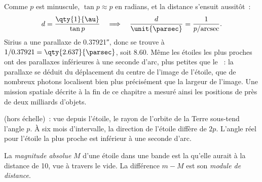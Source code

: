 Comme $p$ est minuscule, $\tan p \approx p$ en radians, et la distance s'ensuit
aussitôt~:
\[
  d = \frac{\qty{1}{\au}}{\tan p} \quad\Longrightarrow\quad
  \frac{d}{\unit{\parsec}} = \frac{1}{p/\text{arcsec}} .
\]
Sirius a une parallaxe de \ang{;;0.37921}, donc se trouve à $1/0.37921 =
\qty{2.637}{\parsec}$, soit \qty{8.60}{\lightyear}. Même les étoiles les plus
proches ont des parallaxes inférieures à une seconde d'arc, plus petites que le
~: la parallaxe se déduit du déplacement du centre de l'image de l'étoile,
que de nombreux photons localisent bien plus précisément que la largeur de
l'image. Une mission spatiale décrite à la fin de ce chapitre a mesuré ainsi les
positions de près de deux milliards d'objets.

\begin{omfigure}

{\small {} (hors échelle)~: vue depuis l'étoile, le rayon de
l'orbite de la Terre sous-tend l'angle $p$. À six mois d'intervalle, la
direction de l'étoile diffère de $2p$. L'angle réel pour l'étoile la plus proche
est inférieur à une seconde d'arc.}
\end{omfigure}

\begin{definition}\label{def:b1:observing-the-sky:absolute}
La \emph{magnitude absolue} $M$ d'une étoile dans une
bande est la  qu'elle aurait à la distance de
\qty{10}{\parsec}, vue à travers le vide. La différence $m - M$ est son
\emph{module de distance}.
\end{definition}

